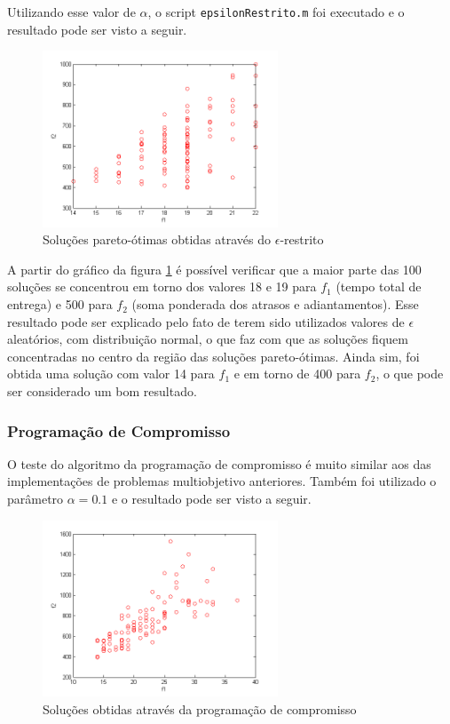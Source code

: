 \documentclass[conference]{IEEEtran}
\begin{document}
Utilizando esse valor de $\alpha$, o script \texttt{epsilonRestrito.m} foi executado e o resultado pode ser visto a seguir.

\begin{figure}[h]
	\centering
	\includegraphics[width=7cm]{img/result-e.png}
	\caption{Soluções pareto-ótimas obtidas através do $\epsilon$-restrito}
	\label{fig:result-e}
\end{figure}
\newpage
A partir do gráfico da figura \ref{fig:result-e} é possível verificar que a maior parte das 100 soluções se concentrou em torno dos valores 18 e 19 para $f_1$ (tempo total de entrega) e 500 para $f_2$ (soma ponderada dos atrasos e adiantamentos). Esse resultado pode ser explicado pelo fato de terem sido utilizados valores de $\epsilon$ aleatórios, com distribuição normal, o que faz com que as soluções fiquem concentradas no centro da região das soluções pareto-ótimas. Ainda sim, foi obtida uma solução com valor 14 para $f_1$ e em torno de 400 para $f_2$, o que pode ser considerado um bom resultado.	

\subsubsection{Programação de Compromisso}

O teste do algoritmo da programação de compromisso é muito similar aos das implementações de problemas multiobjetivo anteriores. Também foi utilizado o parâmetro $\alpha = 0.1$ e o resultado pode ser visto a seguir.

\begin{figure}[h]
	\centering
	\includegraphics[width=7cm]{img/result-pc.png}
	\caption{Soluções obtidas através da programação de compromisso}
	\label{fig:result-pc}
\end{figure}
\end{document}
